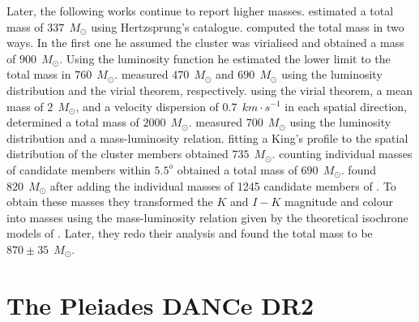 Later, the following works continue to report higher masses. \citet{1956MNRAS.116..296W} estimated a total mass of $337 \ \ M_{\odot}$ using Hertzsprung's catalogue. \citet{Limber1962} computed the total mass in two ways. In the first one he assumed the cluster was virialised and obtained a mass of $900 \ \ M_{\odot}$. Using the luminosity function he estimated the lower limit to the total mass in $760 \ \ M_{\odot}$. \citet{1970AJ.....75..563J} measured $470\ \ M_{\odot}$ and $690\ \ M_{\odot}$ using the luminosity distribution and the virial theorem, respectively. \citet{1980IAUS...85..157V} using the virial theorem, a mean mass of $2\ \ M_{\odot}$, and a velocity dispersion of $0.7\ \ km \cdot s^{-1}$ in each spatial direction, determined a total mass of $2000 \ \ M_{\odot}$. \citet{1995JKAS...28...45L} measured $700 \ \ M_{\odot}$ using the luminosity distribution and a mass-luminosity relation. \citet{Pinfield1998} fitting a King's profile to the spatial distribution of the cluster members obtained $735\ \ M_{\odot}$. \citet{2001AJ....121.2053A} counting individual masses of candidate members within $5.5^o$ obtained a total mass of $690 \ \ M_{\odot}$. \citet{Converse2008} found $820 \ \ M_{\odot}$ after adding the individual masses of 1245  candidate members of \citet{Stauffer2007}. To obtain these masses they  transformed the $K$ and $I-K$ magnitude and colour into masses using the mass-luminosity relation given by the theoretical isochrone models of \citet{1998A&A...337..403B}. Later, \citet{Converse2010} they redo their analysis and found the total mass to be $870\pm35\ \ M_{\odot}$.

%

\section{The Pleiades DANCe DR2}
\label{sect:DR2}

